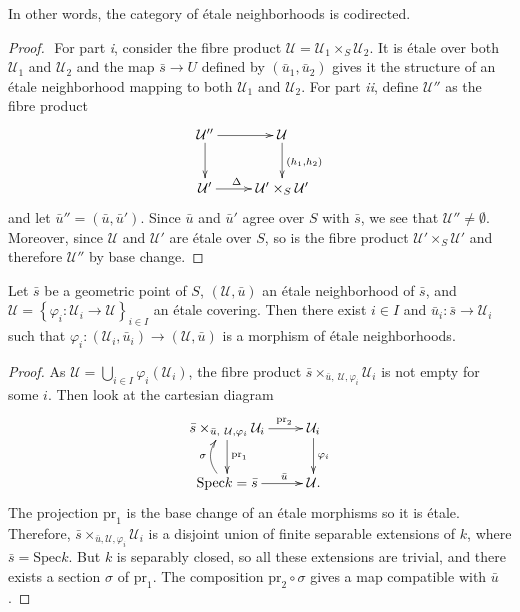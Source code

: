 In other words, the category of \'etale neighborhoods is codirected.

\begin{proof} $ $
For part {\it i}, consider the fibre product $\mathcal{U} = \mathcal{U}_1 \times_S \mathcal{U}_2$. It is \'etale over both $\mathcal{U}_1$ and $\mathcal{U}_2$ and the map $\bar s \to U$ defined by $(\bar u_1, \bar u_2)$ gives it the structure of an \'etale neighborhood mapping to both $\mathcal{U}_1$ and $\mathcal{U}_2$. For part {\it ii}, define $\mathcal{U}''$ as the fibre product 
$$
\xymatrix{
{\mathcal{U}''} \ar[r] \ar[d] & {\mathcal{U}} \ar^{(h_1,h_2)}[d] \\
{\mathcal{U}'} \ar^{\Delta \quad}[r] & {\mathcal{U}' \times_S \mathcal{U}'}
}
$$
and let $\bar u'' = (\bar u, \bar u')$. Since $\bar u$ and $\bar u'$ agree over $S$ with $\bar s$, we see that $\mathcal{U}''\neq\emptyset$. Moreover, since $\mathcal{U}$ and $\mathcal{U}'$ are \'etale over $S$, so is the fibre product $\mathcal{U}'\times_S \mathcal{U}'$ and therefore $\mathcal{U}''$ by base change.
\end{proof}

\begin{lemma} \label{lem:geomPointsAreInSomeOpen}
Let $\bar s$ be a geometric point of $S$, $(\mathcal{U}, \bar u)$ an \'etale neighborhood of $\bar s$, and $\mathcal{U} = \left\{\varphi_i : \mathcal{U}_i \to \mathcal{U} \right\}_{i\in I}$ an \'etale covering. Then there exist $i\in I$ and $\bar u_i: \bar s  \to \mathcal{U}_i$ such that $\varphi_i: (\mathcal{U}_i, \bar u_i) \to (\mathcal{U}, \bar u)$ is a morphism of \'etale neighborhoods.  
\end{lemma}

\begin{proof}
As $\mathcal{U} = \bigcup_{i\in I}\varphi_i(\mathcal{U}_i)$, the fibre product $\bar s \times_{\bar u, \ \mathcal{U}, \varphi_i} \mathcal{U}_i$ is not empty for some $i$. Then look at the cartesian diagram
$$
\xymatrix{ 
{\bar s \times_{\bar u, \ \mathcal{U}, \varphi_i} \mathcal{U}_i} \ar^{\text{pr}_1}[d] \ar^{\qquad \text{pr}_2}[r] & {\mathcal{U}_i} \ar^{\varphi_i}[d] \\ 
{\text{Spec} k = \bar s} \ar@/^1pc/^{\sigma}[u] \ar^{\qquad \bar u}[r] & {\mathcal{U}.} 
}
$$
The projection $\text{pr}_1$ is the base change of an \'etale morphisms so it is \'etale. Therefore, $\bar s \times_{\bar u , \mathcal{U}, \varphi_i} \mathcal{U}_i$ is a disjoint union of finite separable extensions of $k$, where $\bar s = \text{Spec} k$. But $k$ is separably closed, so all these extensions are trivial, and there exists a section $\sigma$ of $\text{pr}_1$. The composition 
$\text{pr}_2 \circ \sigma$ gives a map compatible with $\bar u$.
\end{proof}

